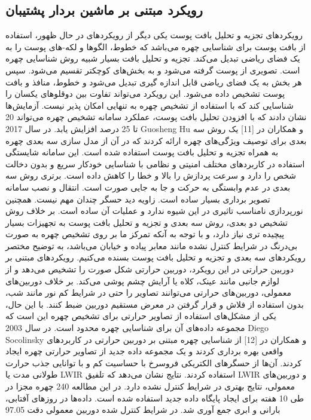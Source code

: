  \subsection{رویکرد مبتنی بر ماشین بردار پشتیبان}
	رویکرد‌های تجزیه و تحلیل بافت پوست
یکی دیگر از رویکردهای در حال ظهور، استفاده از بافت پوست برای شناسایی چهره می‌باشد که خطوط، الگوها و لکه-های پوست را به یک فضای ریاضی تبدیل می‌کند. تجزیه و تحلیل بافت بسیار شبیه روش شناسایی چهره است. تصویری از پوست گرفته می‌شود و به بخش‌های کوچکتر تقسیم می‌شود. سپس هر بخش به یک فضای ریاضی قابل اندازه گیری تبدیل می‌شود و خطوط، منافذ و بافت پوست تشخیص داده می‌شود. این رویکرد می‌تواند تفاوت بین دوقلوهای یکسان را شناسایی کند که با استفاده از تشخیص چهره به تنهایی امکان پذیر نیست. آزمایش‌ها نشان دادند که با افزودن تحلیل بافت پوست، عملکرد سامانه تشخیص چهره می‌تواند 20 تا 25 درصد افزایش یابد.
در سال 2017 Guosheng Hu و همکاران در [11] یک روش سه بعدی برای توصیف ویژگی‌های چهره ارائه کردند که در آن از مدل سازی سه بعدی چهره به همراه تجزیه و تحلیل بافت پوست استفاده شده است. این سامانه شایستگی استفاده در کاربردهای مختلف امنیتی و نظامی با شناسایی خودکار سریع و بدون دخالت شخص را دارد و سرعت پردازش را بالا و خطا را کاهش داده است. برتری روش سه بعدی در عدم وابستگی به حرکت و جا به جایی صورت است. انتقال و نصب سامانه تصویر برداری بسیار ساده است. زاویه دید حسگر چندان مهم نیست. همچنین نورپردازی نامناسب تاثیری در این شیوه ندارد و عملیات آن ساده است.
بر خلاف روش تشخیص دو بعدی، روش سه بعدی و تجزیه و تحلیل بافت پوست به تجهیزات بسیار پیچیده تری نیاز دارد، و با توجه به آنکه تمرکز ما بر روی تشخیص چهره به صورت بی‌درنگ در شرایط کنترل نشده مانند معابر پیاده و خیابان می‌باشد، به توضیح مختصر رویکردهای سه بعدی و تجزیه و تحلیل بافت پوست بسنده می‌کنیم.
	رویکرد‌های مبتنی بر دوربین حرارتی
در این رویکرد، دوربین حرارتی شکل صورت را تشخیص می‌دهد و از لوازم جانبی مانند عینک، کلاه یا آرایش چشم پوشی می‌کند. بر خلاف دوربین‌های معمولی، دوربین‌های حرارتی می‌توانند تصاویر را حتی در شرایط کم نور مانند شب، بدون استفاده از فلاش و قرار گرفتن در معرض مستقیم دوربین ضبط کنند. با این حال، یکی از مشکل‌های استفاده از تصاویر حرارتی برای تشخیص چهره این است که مجموعه داده‌های آن برای شناسایی چهره محدود است.
در سال 2003 Diego Socolinsky و همکاران در [12] از شناسایی چهره مبتنی بر دوربین حرارتی در کاربردهای واقعی بهره برداری کردند و یک مجموعه داده جدید از تصاویر حرارتی چهره ایجاد کردند. آن‌ها از حسگرهای الکتریکی فروسرخ با حساسیت کم و با توانایی جذب حرارت طولانی مدت یا LWIR  استفاده کردند.
نتایج نشان می‌دهد که تلفیق LWIR و دوربین‌های معمولی، نتایج بهتری در شرایط کنترل نشده دارد. در این مطالعه 240 چهره مجزا در طی 10 هفته برای ایجاد پایگاه داده جدید استفاده شده است. داده‌ها در روزهای آفتابی، بارانی و ابری جمع آوری شد. در شرایط کنترل شده دوربین معمولی دقت 97.05%
